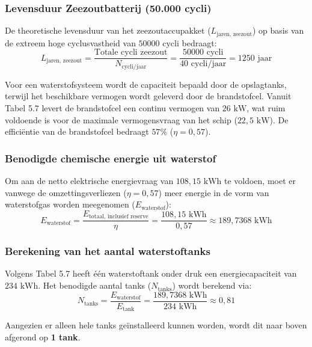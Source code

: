 \subsubsection*{Levensduur Zeezoutbatterij (50.000 cycli)}
De theoretische levensduur van het zeezoutaccupakket ($L_{\text{jaren, zeezout}}$) op basis van de extreem hoge cyclusvastheid van $50000 \text{ cycli}$ bedraagt:
\begin{equation}
L_{\text{jaren, zeezout}} = \frac{\text{Totale cycli zeezout}}{N_{\text{cycli/jaar}}} = \frac{50000 \text{ cycli}}{40 \text{ cycli/jaar}} = 1250 \text{ jaar}
\end{equation}

\noindent Voor een waterstofsysteem wordt de capaciteit bepaald door de opslagtanks, terwijl het beschikbare vermogen wordt geleverd door de brandstofcel. Vanuit Tabel 5.7 levert de brandstofcel een continu vermogen van $26 \text{ kW}$, wat ruim voldoende is voor de maximale vermogensvraag van het schip ($22{,}5 \text{ kW}$). De efficiëntie van de brandstofcel bedraagt $57\%$ ($\eta = 0{,}57$).

\subsubsection*{Benodigde chemische energie uit waterstof}
Om aan de netto elektrische energievraag van $108{,}15 \text{ kWh}$ te voldoen, moet er vanwege de omzettingsverliezen ($\eta = 0{,}57$) meer energie in de vorm van waterstofgas worden meegenomen ($E_{\text{waterstof}}$):
\begin{equation}
E_{\text{waterstof}} = \frac{E_{\text{totaal, inclusief reserve}}}{\eta} = \frac{108{,}15 \text{ kWh}}{0{,}57} \approx 189{,}7368 \text{ kWh}
\end{equation}

\subsubsection*{Berekening van het aantal waterstoftanks}
Volgens Tabel 5.7 heeft één waterstoftank onder druk een energiecapaciteit van $234 \text{ kWh}$. Het benodigde aantal tanks ($N_{\text{tanks}}$) wordt berekend via:
\begin{equation}
N_{\text{tanks}} = \frac{E_{\text{waterstof}}}{E_{\text{tank}}} = \frac{189{,}7368 \text{ kWh}}{234 \text{ kWh}} \approx 0{,}81
\end{equation}

\noindent Aangezien er alleen hele tanks geïnstalleerd kunnen worden, wordt dit naar boven afgerond op \textbf{1 tank}. 

